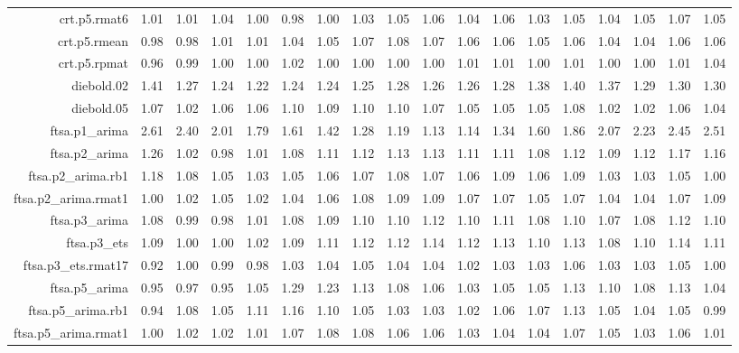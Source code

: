\begin{tabular}{rrrrrrrrrrrrrrrrrr}
  crt.p5.rmat6 & 1.01 & 1.01 & 1.04 & 1.00 & 0.98 & 1.00 & 1.03 & 1.05 & 1.06 & 1.04 & 1.06 & 1.03 & 1.05 & 1.04 & 1.05 & 1.07 & 1.05 \\ 
  crt.p5.rmean & 0.98 & 0.98 & 1.01 & 1.01 & 1.04 & 1.05 & 1.07 & 1.08 & 1.07 & 1.06 & 1.06 & 1.05 & 1.06 & 1.04 & 1.04 & 1.06 & 1.06 \\ 
  crt.p5.rpmat & 0.96 & 0.99 & 1.00 & 1.00 & 1.02 & 1.00 & 1.00 & 1.00 & 1.00 & 1.01 & 1.01 & 1.00 & 1.01 & 1.00 & 1.00 & 1.01 & 1.04 \\ 
  diebold.02 & 1.41 & 1.27 & 1.24 & 1.22 & 1.24 & 1.24 & 1.25 & 1.28 & 1.26 & 1.26 & 1.28 & 1.38 & 1.40 & 1.37 & 1.29 & 1.30 & 1.30 \\ 
  diebold.05 & 1.07 & 1.02 & 1.06 & 1.06 & 1.10 & 1.09 & 1.10 & 1.10 & 1.07 & 1.05 & 1.05 & 1.05 & 1.08 & 1.02 & 1.02 & 1.06 & 1.04 \\ 
  ftsa.p1\_arima & 2.61 & 2.40 & 2.01 & 1.79 & 1.61 & 1.42 & 1.28 & 1.19 & 1.13 & 1.14 & 1.34 & 1.60 & 1.86 & 2.07 & 2.23 & 2.45 & 2.51 \\ 
  ftsa.p2\_arima & 1.26 & 1.02 & 0.98 & 1.01 & 1.08 & 1.11 & 1.12 & 1.13 & 1.13 & 1.11 & 1.11 & 1.08 & 1.12 & 1.09 & 1.12 & 1.17 & 1.16 \\ 
  ftsa.p2\_arima.rb1 & 1.18 & 1.08 & 1.05 & 1.03 & 1.05 & 1.06 & 1.07 & 1.08 & 1.07 & 1.06 & 1.09 & 1.06 & 1.09 & 1.03 & 1.03 & 1.05 & 1.00 \\ 
  ftsa.p2\_arima.rmat1 & 1.00 & 1.02 & 1.05 & 1.02 & 1.04 & 1.06 & 1.08 & 1.09 & 1.09 & 1.07 & 1.07 & 1.05 & 1.07 & 1.04 & 1.04 & 1.07 & 1.09 \\ 
  ftsa.p3\_arima & 1.08 & 0.99 & 0.98 & 1.01 & 1.08 & 1.09 & 1.10 & 1.10 & 1.12 & 1.10 & 1.11 & 1.08 & 1.10 & 1.07 & 1.08 & 1.12 & 1.10 \\ 
  ftsa.p3\_ets & 1.09 & 1.00 & 1.00 & 1.02 & 1.09 & 1.11 & 1.12 & 1.12 & 1.14 & 1.12 & 1.13 & 1.10 & 1.13 & 1.08 & 1.10 & 1.14 & 1.11 \\ 
  ftsa.p3\_ets.rmat17 & 0.92 & 1.00 & 0.99 & 0.98 & 1.03 & 1.04 & 1.05 & 1.04 & 1.04 & 1.02 & 1.03 & 1.03 & 1.06 & 1.03 & 1.03 & 1.05 & 1.00 \\ 
  ftsa.p5\_arima & 0.95 & 0.97 & 0.95 & 1.05 & 1.29 & 1.23 & 1.13 & 1.08 & 1.06 & 1.03 & 1.05 & 1.05 & 1.13 & 1.10 & 1.08 & 1.13 & 1.04 \\ 
  ftsa.p5\_arima.rb1 & 0.94 & 1.08 & 1.05 & 1.11 & 1.16 & 1.10 & 1.05 & 1.03 & 1.03 & 1.02 & 1.06 & 1.07 & 1.13 & 1.05 & 1.04 & 1.05 & 0.99 \\ 
  ftsa.p5\_arima.rmat1 & 1.00 & 1.02 & 1.02 & 1.01 & 1.07 & 1.08 & 1.08 & 1.06 & 1.06 & 1.03 & 1.04 & 1.04 & 1.07 & 1.05 & 1.03 & 1.06 & 1.01 \\ 

\end{tabular}
